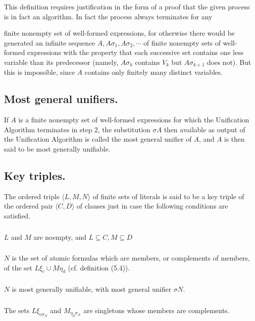 \documentclass[8pt]{extarticle}
\begin{document}
This definition requires justification in the form of a proof that the given
process is in fact an algorithm. In fact the process always terminates for any

\newpage

finite nonempty set of well-formed expressions, for otherwise there would be
generated an infinite sequence $A, A\sigma_1,A\sigma_2,\dotsm$ of finite nonempty sets of well-formed expressions with the property that each successive set contains one less variable than its predecessor (namely, $A\sigma_k$ contains $V_k$ but $A\sigma_{k+1}$ does not). But this is impossible, since $A$ contains only finitely many distinct variables.

\subsection{Most general unifiers.}
If $A$ is a finite nonempty set of well-formed expressions for which the Unification Algorithm terminates in step 2, the substitution $\sigma A$ then available as output of the Unification Algorithm is called the most
general unifier of $A$, and $A$ is then said to be most generally unifiable.

\subsection{Key triples.}
The ordered triple $\langle L, M, N \rangle$ of finite sets of literals is said
to be a key triple of the ordered pair $\langle C,D\rangle$ of clauses just in case the following conditions are satisfied.

\subsubsection{}
$L$ and $M$ are noempty, and $L \subseteq C, M \subseteq D$
\subsubsection{}
$N$ is the set of atomic formulas which are members, or complements
of members, of the set $L\xi_c\cup M\eta_d$ (cf. definition (5.4)).
\subsubsection{}
$N$ is most generally unifiable, with most general unifier $\sigma N$.
\subsubsection{}
The sets $L\xi_{c\sigma_N}$ and $M_{\eta_d\sigma_N}$ are singletons whose members are complements.
\end{document}
